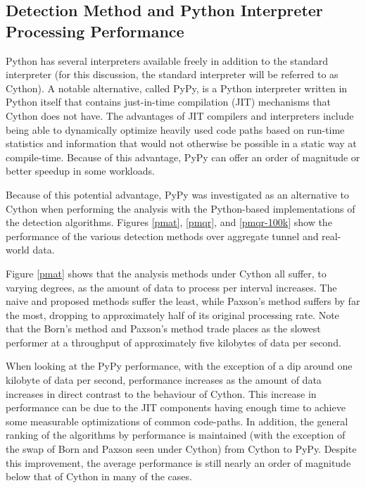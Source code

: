 \documentclass[12pt]{report}
\theoremstyle{remark}
\theoremstyle{definition}
\theoremstyle{definition}
\theoremstyle{definition}
\begin{document}
\subsection{Detection Method and Python Interpreter Processing Performance}
\label{processing-perf}
Python has several interpreters available freely in addition to the standard
interpreter (for this discussion, the standard interpreter will be referred to
as Cython). A notable alternative, called PyPy, is a Python interpreter written
in Python itself that contains just-in-time compilation (JIT) mechanisms that
Cython does not have. The advantages of JIT compilers and interpreters include
being able to dynamically optimize heavily used code paths based on run-time
statistics and information that would not otherwise be possible in a static way
at compile-time. Because of this advantage, PyPy can offer an order of magnitude
or better speedup\cite{pypyvc-strfmt} in some workloads.

Because of this potential advantage, PyPy was investigated as an alternative to
Cython when performing the analysis with the Python-based implementations of the
detection algorithms. Figures \ref{pmat}, \ref{pmqr}, and \ref{pmqr-100k} show
the performance of the various detection methods over aggregate tunnel and
real-world data.

Figure \ref{pmat} shows that the analysis methods under Cython all suffer, to varying
degrees, as the amount of data to process per interval increases. The naive and
proposed methods suffer the least, while Paxson's method suffers by far the most,
dropping to approximately half of its original processing rate. Note that the
Born's method and Paxson's method trade places as the slowest performer at a
throughput of approximately five kilobytes of data per second.

When looking at
the PyPy performance, with the exception of a dip around one kilobyte of data
per second, performance increases as the amount of data increases in direct
contrast to the behaviour of Cython. This increase in performance can be due to
the JIT components having enough time to achieve some measurable optimizations
of common code-paths. In addition, the general ranking of the algorithms by
performance is maintained (with the exception of the swap of Born and Paxson
seen under Cython) from Cython to PyPy. Despite this improvement, the average
performance is still nearly an order of magnitude below that of Cython in many
of the cases.
\end{document}
